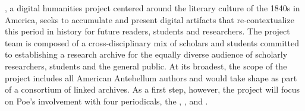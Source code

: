 \projectname, a digital humanities project centered around the literary culture of the 1840s in America, seeks to accumulate and present digital artifacts that re-contextualize this period in history for future readers, students and researchers. The project team is composed of a cross-disciplinary mix of scholars and students committed to establishing a research archive for the equally diverse audience of scholarly researchers, students and the general public. At its broadest, the scope of the project includes all American Antebellum authors and would take shape as part of a consortium of linked archives. As a first step, however, the project will focus on Poe's involvement with four periodicals, the \bwj, \slm, \bgm and \gm.